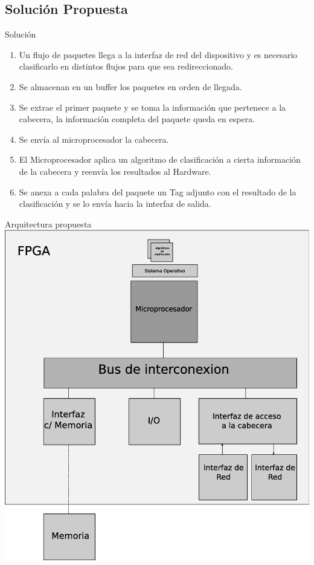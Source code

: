 \documentclass[xcolor=dvipsnames]{beamer}
\begin{document}
\subsection{Solución Propuesta}
\begin{frame}{Solución}

    \begin{enumerate}
      \scriptsize
 \pause     	\item Un flujo de paquetes llega a la interfaz de red del dispositivo y es necesario clasificarlo en distintos flujos para que sea redireccionado.
\pause 	\item Se almacenan en un buffer los paquetes en orden de llegada.
\pause 	\item Se extrae el primer paquete y se toma la información que pertenece a la cabecera, la información completa del paquete queda en espera.
\pause 	\item Se envía al microprocesador la cabecera. 
\pause 	\item El Microprocesador aplica un algoritmo de clasificación a cierta información de la cabecera y reenvía los resultados al Hardware. 
\pause 	\item Se anexa a cada palabra del paquete un Tag adjunto con el resultado de la clasificación y se lo envía hacia la interfaz de salida.
    \end{enumerate}

\end{frame}

\begin{frame}{Arquitectura propuesta}
   \center 
   \includegraphics[scale=0.25]{figures/solucion.eps}
\end{frame}
\end{document}
